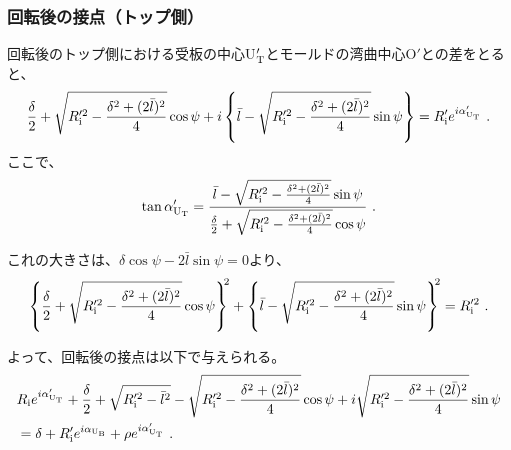 \subsubsection{回転後の接点（トップ側）}
回転後のトップ側における受板の中心U$_\text T'$とモールドの湾曲中心O$'$との差をとると、
\begin{align*}
  \frac\delta2+\sqrt{R_\text i'^2-\frac{\delta^2+(2\bar l)^2}4}\cos\psi
  +i\left\{\bar l-\sqrt{R_\text i'^2-\frac{\delta^2+(2\bar l)^2}4}\sin\psi\right\}
  = R_\text i'e^{i\alpha'_{\text U_\text T}}\ .
\end{align*}
ここで、
\begin{align*}
  \tan\alpha'_{\text U_\text T}
  = \frac{\bar l-\sqrt{R_\text i'^2-\frac{\delta^2+(2\bar l)^2}4}\sin\psi}
         {\frac\delta2+\sqrt{R_\text i'^2-\frac{\delta^2+(2\bar l)^2}4}\cos\psi}\ .
\end{align*}
\begin{hosokubox}
これの大きさは、$\delta\cos\psi-2\bar l\sin\psi = 0$より、
\begin{align*}
  \left\{\frac\delta2+\sqrt{R_\text i'^2-\frac{\delta^2+(2\bar l)^2}4}\cos\psi\right\}^{\!\!2}
  +\left\{\bar l-\sqrt{R_\text i'^2-\frac{\delta^2+(2\bar l)^2}4}\sin\psi\right\}^{\!\!2}
  = R_\text i'^2\ .
\end{align*}
\end{hosokubox}
よって、回転後の接点は以下で与えられる。
\begin{align*}
  &  R_\text ie^{i\alpha'_{\text U_\text T}}
     +\frac\delta2+\sqrt{R_\text i'^2-\bar l^2}-\sqrt{R_\text i'^2-\frac{\delta^2+(2\bar l)^2}4}\cos\psi
     +i\sqrt{R_\text i'^2-\frac{\delta^2+(2\bar l)^2}4}\sin\psi\\
  &= \delta+R_\text i'e^{i\alpha_{\text U_\text B}}+\rho e^{i\alpha'_{\text U_\text T}}\ .
\end{align*}


